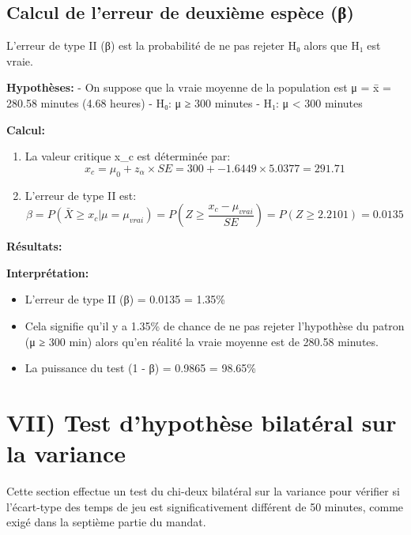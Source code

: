 \documentclass[11pt]{article}
\providecommand{\tightlist}{%
      \setlength{\itemsep}{0pt}\setlength{\parskip}{0pt}}
\newcommand{\prompt}[4]{
        {\ttfamily\llap{{\color{#2}[#3]:\hspace{3pt}#4}}\vspace{-\baselineskip}}
    }
\begin{document}
            
\prompt{Out}{outcolor}{34}{}
    
    \subsection{Calcul de l'erreur de deuxième espèce
(β)}\label{calcul-de-lerreur-de-deuxiuxe8me-espuxe8ce-ux3b2}

L'erreur de type II (β) est la probabilité de ne pas rejeter H₀ alors
que H₁ est vraie.

\textbf{Hypothèses:} - On suppose que la vraie moyenne de la population
est μ = x̄ = 280.58 minutes (4.68 heures) - H₀: μ ≥ 300 minutes - H₁: μ
\textless{} 300 minutes

\textbf{Calcul:}

\begin{enumerate}
\def\labelenumi{\arabic{enumi}.}
\item
  La valeur critique x\_c est déterminée par: \[
  x_c = \mu_0 + z_\alpha \times SE = 300 + -1.6449 \times 5.0377 = 291.71
  \]
\item
  L'erreur de type II est: \[
  \beta = P(\bar{X} \geq x_c | \mu = \mu_{vrai}) = P\left(Z \geq \frac{x_c - \mu_{vrai}}{SE}\right) = P(Z \geq 2.2101) = 0.0135
  \]
\end{enumerate}

\textbf{Résultats:}

\textbf{Interprétation:}

\begin{itemize}
\tightlist
\item
  L'erreur de type II (β) = 0.0135 = 1.35\%
\item
  Cela signifie qu'il y a 1.35\% de chance de ne pas rejeter l'hypothèse
  du patron (μ ≥ 300 min) alors qu'en réalité la vraie moyenne est de
  280.58 minutes.
\item
  La puissance du test (1 - β) = 0.9865 = 98.65\%
\end{itemize}

    

    \section{VII) Test d'hypothèse bilatéral sur la
variance}\label{vii-test-dhypothuxe8se-bilatuxe9ral-sur-la-variance}

Cette section effectue un test du chi-deux bilatéral sur la variance
pour vérifier si l'écart-type des temps de jeu est significativement
différent de 50 minutes, comme exigé dans la septième partie du mandat.
\end{document}
